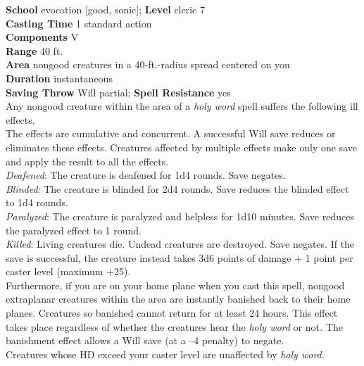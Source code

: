 \textbf{School} evocation [good, sonic]; \textbf{Level} cleric 7\\
\textbf{Casting Time} 1 standard action\\
\textbf{Components} V\\
\textbf{Range} 40 ft.\\
\textbf{Area} nongood creatures in a 40-ft.-radius spread centered on you\\
\textbf{Duration} instantaneous\\
\textbf{Saving Throw} Will partial; \textbf{Spell Resistance} yes\\
Any nongood creature within the area of a \textit{holy word }spell suffers the following ill effects.\\
The effects are cumulative and concurrent. A successful Will save reduces or eliminates these effects. Creatures affected by multiple effects make only one save and apply the result to all the effects.\\
\textit{Deafened}: The creature is deafened for 1d4 rounds. Save negates.\\
\textit{Blinded}: The creature is blinded for 2d4 rounds. Save reduces the blinded effect to 1d4 rounds.\\
\textit{Paralyzed}: The creature is paralyzed and helpless for 1d10 minutes. Save reduces the paralyzed effect to 1 round.\\
\textit{Killed}: Living creatures die. Undead creatures are destroyed. Save negates. If the save is successful, the creature instead takes 3d6 points of damage + 1 point per caster level (maximum +25).\\
Furthermore, if you are on your home plane when you cast this spell, nongood extraplanar creatures within the area are instantly banished back to their home planes. Creatures so banished cannot return for at least 24 hours. This effect takes place regardless of whether the creatures hear the \textit{holy word} or not\textit{. }The banishment effect allows a Will save (at a --4 penalty) to negate.\\
Creatures whose HD exceed your caster level are unaffected by \textit{holy word.}\\
